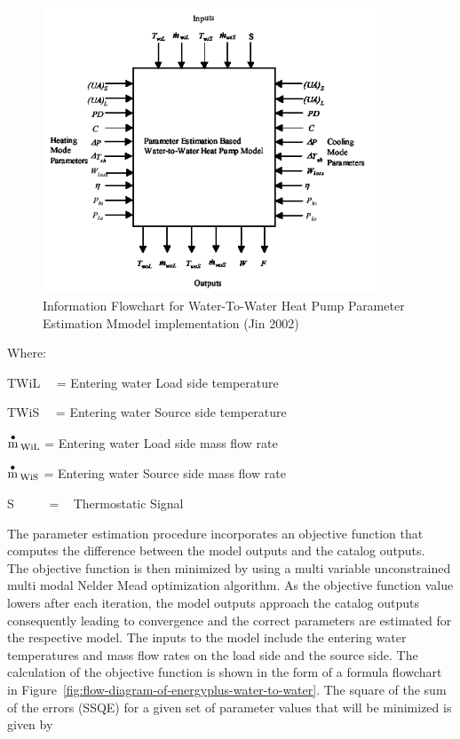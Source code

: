 \begin{figure}[hbtp] %
\centering
\includegraphics[width=0.9\textwidth, height=0.9\textheight, keepaspectratio=true]{media/image5306.png}
\caption{Information Flowchart for Water-To-Water Heat Pump Parameter Estimation Mmodel implementation (Jin 2002) \protect \label{fig:information-flowchart-for-water-to-water-heat}}
\end{figure}

Where:

TWiL~~ = Entering water Load side temperature

TWiS~~ = Entering water Source side temperature

\(\mathop {\rm{m}}\limits^ \bullet {}_{{\rm{WiL}}}\) = Entering water Load side mass flow rate

\(\mathop {\rm{m}}\limits^ \bullet {}_{{\rm{WiS}}}\) = Entering water Source side mass flow rate

S~~~~~ = ~ Thermostatic Signal

The parameter estimation procedure incorporates an objective function that computes the difference between the model outputs and the catalog outputs.~ The objective function is then minimized by using a multi variable unconstrained multi modal Nelder Mead optimization algorithm. As the objective function value lowers after each iteration, the model outputs approach the catalog outputs consequently leading to convergence and the correct parameters are estimated for the respective model. The inputs to the model include the entering water temperatures and mass flow rates on the load side and the source side. The calculation of the objective function is shown in the form of a formula flowchart in Figure~\ref{fig:flow-diagram-of-energyplus-water-to-water}. The square of the sum of the errors (SSQE) for a given set of parameter values that will be minimized is given by

